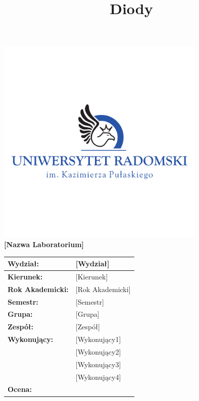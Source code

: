 \documentclass[10.5pt]{article}
\title{Diody}
\date{}
\begin{document}
\thispagestyle{empty} %

\begin{center}
    \includegraphics[width=10cm,page=1, trim=40 0 0 0]{logaUR.pdf} \\
    {\large\textbf{[Nazwa Laboratorium]}} \\
\end{center}

\vspace{0.5cm}

\begin{center}
\end{center}

\vspace{1.5cm}

\begin{center}
\begin{tabular}{|>{\bfseries}p{4cm}|p{6cm}|}
\hline
Wydział: & [Wydział] \\
\hline
Kierunek: & [Kierunek] \\
\hline
Rok Akademicki: & [Rok Akademicki] \\
\hline
Semestr: & [Semestr] \\
\hline
Grupa: & [Grupa] \\
\hline
Zespół: & [Zespół] \\
\hline
Wykonujący: & [Wykonujący1] \\
& [Wykonujący2] \\
& [Wykonujący3] \\
& [Wykonujący4] \\
\hline
Ocena: &  \\
\hline
\end{tabular}
\end{center}
\end{document}
